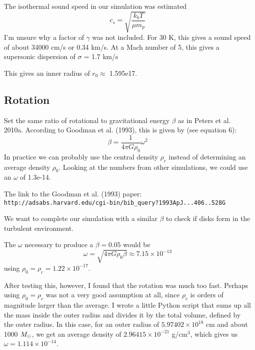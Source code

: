 \documentclass[a4paper]{tufte-handout}
\begin{document}
The isothermal sound speed in our simulation was estimated
\begin{equation}
  c_s = \sqrt{\frac{k_b T}{\mu m_p}}
\end{equation}
I'm unsure why a factor of $\gamma$ was not included. For 30 K, this gives a sound speed of about 34000 cm/s or 0.34 km/s. At a Mach number of 5, this gives a supersonic dispersion of $\sigma$ = 1.7 km/s

This gives an inner radius of $r_0 \approx$ 1.595e17.

\subsection*{Rotation}

Set the same ratio of rotational to gravitational energy $\beta$ as in Peters et al. 2010a. According to Goodman et al. (1993), this is given by (see equation 6):
\begin{equation}
  \beta = \frac{1}{4 \pi G \rho_0} \omega^2
\end{equation}
In practice we can probably use the central density $\rho_c$ instead of determining an average density $\rho_0$. Looking at the numbers from other simulations, we could use an $\omega$ of 1.3e-14.

The link to the Goodman et al. (1993) paper:\\
{\tt http://adsabs.harvard.edu/cgi-bin/bib\_query?1993ApJ...406..528G}

We want to complete our simulation with a similar $\beta$ to check if disks form in the turbulent environment.

The $\omega$ necessary to produce a $\beta = 0.05$ would be
\begin{equation}
  \omega = \sqrt{4 \pi G \rho_0 \beta} \approx 7.15\times 10^{-13}
\end{equation}
using $\rho_0 = \rho_c = 1.22\times10^{-17}$.

After testing this, however, I found that the rotation was much too fast. Perhaps using $\rho_0 = \rho_c$ was not a very good assumption at all, since $\rho_c$ is orders of magnitude larger than the average. I wrote a little Python script that sums up all the mass inside the outer radius and divides it by the total volume, defined by the outer radius. In this case, for an outer radius of $5.97402\times 10^{18}$ cm and about 1000 $M_\odot$, we get an average density of $2.96415\times 10^{-21}$ g/cm$^3$, which gives us $\omega = 1.114 \times 10^{-14}$.





\end{document}
